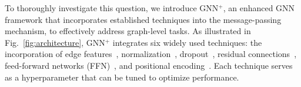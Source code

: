 
To thoroughly investigate this question, we introduce GNN$^+$, an enhanced GNN framework that incorporates established techniques into the message-passing mechanism, to effectively address graph-level tasks. As illustrated in Fig.~\ref{fig:architecture}, GNN$^+$ integrates six widely used techniques: the incorporation of edge features~\cite{gilmer2017neural}, normalization~\cite{ioffe2015batch}, dropout~\cite{srivastava2014dropout}, residual connections~\cite{he2016deep}, feed-forward networks (FFN)~\cite{vaswani2017attention}, and positional encoding~\cite{vaswani2017attention}. Each technique serves as a hyperparameter that can be tuned to optimize performance.





